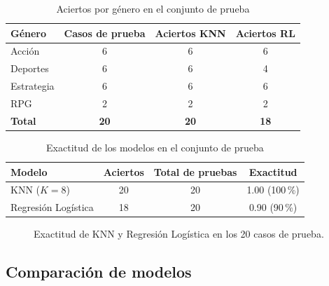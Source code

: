 \documentclass[]{article}
\begin{document}
\begin{table}[H]
\centering
\small
\caption{Aciertos por género en el conjunto de prueba}
\label{tab:porgenero}
\begin{tabular}{l c c c}
\toprule
\textbf{Género} & \textbf{Casos de prueba} & \textbf{Aciertos KNN} & \textbf{Aciertos RL} \\
\midrule
Acción     & 6  & 6  & 6 \\
Deportes   & 6  & 6  & 4 \\
Estrategia & 6  & 6  & 6 \\
RPG        & 2  & 2  & 2 \\
\midrule
\textbf{Total} & \textbf{20} & \textbf{20} & \textbf{18} \\
\bottomrule
\end{tabular}
\end{table}

\begin{table}[H]
\centering
\small
\caption{Exactitud de los modelos en el conjunto de prueba}
\label{tab:resumen}
\begin{tabular}{l c c c}
\toprule
\textbf{Modelo} & \textbf{Aciertos} & \textbf{Total de pruebas} & \textbf{Exactitud} \\
\midrule
KNN ($K=8$)          & 20 & 20 & 1.00 (100\,\%) \\
Regresión Logística  & 18 & 20 & 0.90 (90\,\%) \\
\bottomrule
\end{tabular}
\end{table}

\begin{figure}[H]
\centering
{}
\caption{Exactitud de KNN y Regresión Logística en los 20 casos de prueba.}
\label{fig:exactitud}
\end{figure}

\subsection{Comparación de modelos}
\end{document}
